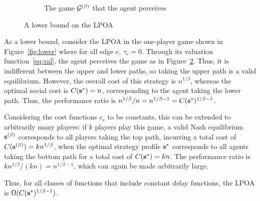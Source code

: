\documentclass[twoside]{article}
\begin{document}
\begin{multicols}{2}
\begin{figure}[H]
\begin{subfigure}[b]{\linewidth}
    \caption{The game $\mathcal{G}^{(\beta)}$ that the agent perceives}
    \label{fig:lowerbet}
  \end{subfigure}
  \caption{A lower bound on the LPOA}
\end{figure}

As a lower bound, consider the LPOA in the one-player game shown in
Figure~\ref{fig:lower} where for all edge $e$, $\tau_e = 0$. Through its valuation function~\eqref{eq:val}, the agent
perceives the game as in Figure~\ref{fig:lowerbet}. Thus, it is indifferent
between the upper and lower paths, so taking the upper path is a valid
equilibrium. However, the overall cost of this strategy is $n^{1/\beta}$,
whereas the optimal social cost is $C(\mathbf{s}^*) = n$, corresponding to the agent
taking the lower path. Thus, the performance ratio is $n^{1/\beta}/n =
n^{1/\beta-1} = C(\mathbf{s}^*)^{1/\beta-1}$.

Considering the cost functions $c_e$ to be constants, this can be extended to
arbitrarily many players: if $k$ players play this game, a valid Nash
equilibrium $\mathbf{s}^{(\beta)}$ corresponds to all players taking the top path, incurring
a total cost of $C(\mathbf{s}^{(\beta)}) = kn^{1/\beta}$, when the optimal strategy profile
$\mathbf{s}^*$ corresponds to all agents taking the bottom path for a total cost of
$C(\mathbf{s}^*) = kn$. The performance ratio is $kn^{1/\beta}/(kn) = n^{1/\beta-1}$,
which can again be made arbitrarily large.

Thus, for all classes of functions that include constant delay functions, the
LPOA is $\Omega(C(\mathbf{s}^*)^{1/\beta-1})$.


\end{multicols}
\end{document}
